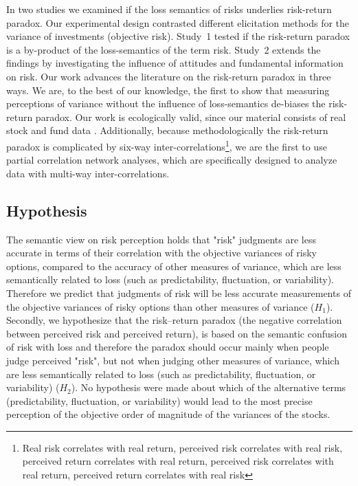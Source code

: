\documentclass[a4paper,man, natbib,floatsintext]{apa6} %
\begin{document}
In two studies we examined if the loss semantics of risks underlies risk-return paradox. Our experimental design contrasted different elicitation methods for the variance of investments (objective risk). Study~1 tested if the risk-return paradox is a by-product of the loss-semantics of the term risk. Study~2 extends the findings by investigating the influence of attitudes and fundamental information on risk.  Our work advances the literature on the risk-return paradox in three ways. We are, to the best of our knowledge, the first to show that measuring perceptions of variance without the influence of loss-semantics de-biases the risk-return paradox. Our work is ecologically valid, since our material consists of real stock and fund data \citep[as also][]{Kempf2014}.  Additionally, because methodologically the risk-return paradox is complicated by six-way inter-correlations\footnote{Real risk correlates with real return, perceived risk correlates with real risk,  perceived return correlates with real return, perceived risk correlates with real return, perceived return correlates with real risk}, we are the first to use partial correlation network analyses, which are specifically designed to analyze data with multi-way inter-correlations.

\subsection{Hypothesis}
The semantic view on risk perception holds that "risk" judgments are less accurate in terms of their correlation with the objective variances of risky options, compared to the accuracy of other measures of variance, which are less semantically related to loss (such as predictability, fluctuation, or variability). Therefore we predict that judgments of risk will be less accurate measurements of the objective variances of risky options than other measures of variance ($H_1$). Secondly, we hypothesize that the risk--return paradox (the negative correlation between perceived risk and perceived return), is based on the semantic confusion of risk with loss and therefore the paradox should occur mainly when people judge perceived "risk", but not when judging other measures of variance, which are less semantically related to loss (such as predictability, fluctuation, or variability) ($H_2$). No hypothesis were made about which of the alternative terms (predictability, fluctuation, or variability) would lead to the most precise perception of the objective order of magnitude of the variances of the stocks.
\end{document}
